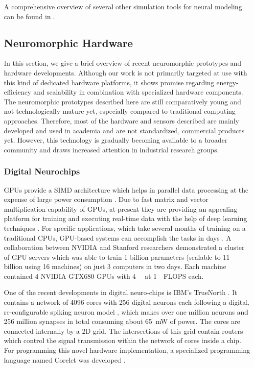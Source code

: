 A comprehensive overview of several other simulation tools for neural modeling can be found in \cite{Brette2007}.

\subsection{Neuromorphic Hardware}
\label{sec:neuromorphic_HW}

In this section, we give a brief overview of recent neuromorphic prototypes and hardware developments.
Although our work is not primarily targeted at use with this kind of dedicated hardware platforms, it shows promise regarding energy-efficiency and scalability in combination with specialized hardware components.
The neuromorphic prototypes described here are still comparatively young and not technologically mature yet, especially compared to traditional computing approaches.
Therefore, most of the hardware and sensors described are mainly developed and used in academia and are not standardized, commercial products yet.
However, this technology is gradually becoming available to a broader community and draws increased attention in industrial research groups.

\subsubsection{Digital Neurochips}
\acp{GPU} provide a \ac{SIMD} architecture which helps in parallel data processing at the expense of large power consumption \cite{Krichmar2011, Carlson2014}.
Due to fast matrix and vector multiplication capability of \acp{GPU}, at present they are providing an appealing platform for training and executing real-time data with the help of deep learning techniques \cite{Schmidhuber2015}.
For specific applications, which take several months of training on a traditional \acp{CPU}, \ac{GPU}-based systems can accomplish the tasks in days \cite{Edwards2015}.
A collaboration between NVIDIA and Stanford researchers demonstrated a cluster of \ac{GPU} servers which was able to train 1 billion parameters (scalable to 11 billion using 16 machines) on just 3 computers in two days.
Each machine contained 4 NVIDIA GTX680 \acp{GPU} with \SI{4}{\giga\byte} at \SI{1}{\tera\nothing}\ac{FLOPS} each.

One of the recent developments in digital neuro-chips is IBM's TrueNorth \cite{Akopyan2015}.
It contains a network of \num{4096} cores with \num{256} digital neurons each following a digital, re-configurable spiking neuron model \cite{Cassidy2013}, which makes over one million neurons and \num{256} million synapses in total consuming about \SI{65}{\milli\watt} of power.
The cores are connected internally by a 2D grid.
The intersections of this grid contain routers which control the signal transmission within the network of cores inside a chip.
For programming this novel hardware implementation, a specialized programming language named Corelet was developed \cite{Amir2013}.

